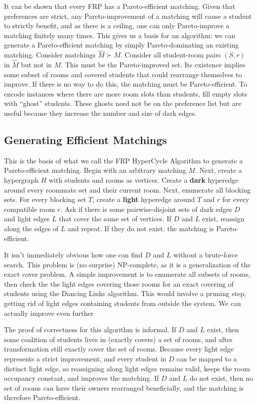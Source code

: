 \documentclass[12pt]{article}
\begin{document}
It can be shown that every FRP has a Pareto-efficient matching. Given that preferences are strict, any Pareto-improvement of a matching will cause a student to strictly benefit, and as there is a ceiling, one can only Pareto-improve a matching finitely many times. This gives us a basis for an algorithm: we can generate a Pareto-efficient matching by simply Pareto-dominating an existing matching. Consider matchings $\hat M \succ M$. Consider all student-room pairs $(S, r)$ in $\hat M$ but not in $M$. This must be the Pareto-improved set. Its existence implies some subset of rooms and covered students that could rearrange themselves to improve. If there is no way to do this, the matching must be Pareto-efficient. To encode instances where there are more room slots than students, fill empty slots with ``ghost'' students. These ghosts need not be on the preference list but are useful because they increase the number and size of dark edges.

\subsection*{Generating Efficient Matchings}

This is the basis of what we call the FRP HyperCycle Algorithm to generate a Pareto-efficient matching. Begin with an arbitrary matching $M$. Next, create a hypergraph $H$ with students and rooms as vertices. Create a \textbf{dark} hyperedge around every roommate set and their current room. Next, enumerate all blocking sets. For every blocking set $T$, create a \textbf{light} hyperedge around $T$ and $r$ for every compatible room $r$. Ask if there is some pairwise-disjoint sets of dark edges $D$ and light edges $L$ that cover the same set of vertices. If $D$ and $L$ exist, reassign along the edges of $L$ and repeat. If they do not exist, the matching is Pareto-efficient.

It isn't immediately obvious how one can find $D$ and $L$ without a brute-force search. This problem is (no surprise) NP-complete, as it is a generalization of the exact cover problem. A simple improvement is to enumerate all subsets of rooms, then check the the light edges covering those rooms for an exact covering of students using the Dancing Links algorithm. This would involve a pruning step, getting rid of light edges containing students from outside the system. We can actually improve even further 

The proof of correctness for this algorithm is informal. If $D$ and $L$ exist, then some coalition of students lives in (exactly covers) a set of rooms, and after transformation still exactly cover the set of rooms. Because every light edge represents a strict improvement, and every student in $D$ can be mapped to a distinct light edge, so reassigning along light edges remains valid, keeps the room occupancy constant, and improves the matching. If $D$ and $L$ do not exist, then no set of rooms can have their owners rearranged beneficially, and the matching is therefore Pareto-efficient.
\end{document}
